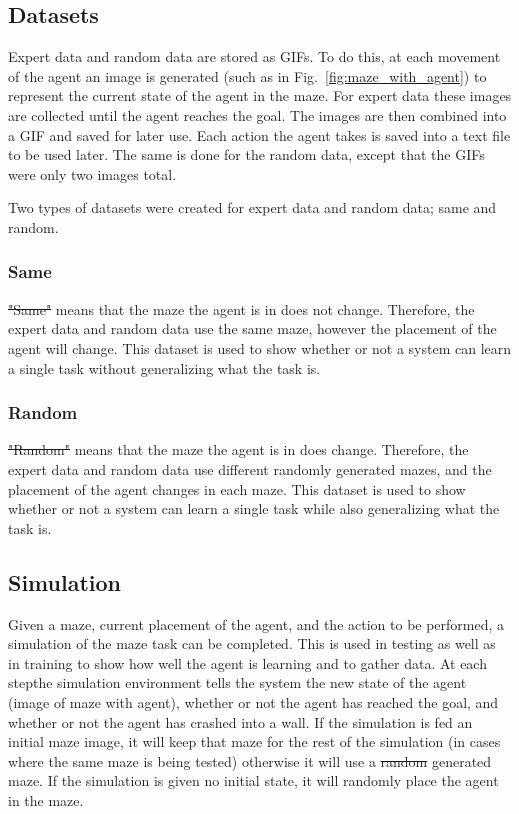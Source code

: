 \documentclass[12pt,american]{report}
\providecommand{\DIFaddtex}[1]{{\protect\color{blue}\uwave{#1}}} %
\providecommand{\DIFdeltex}[1]{{\protect\color{red}\sout{#1}}}                      %
\providecommand{\DIFaddbegin}{} %
\providecommand{\DIFaddend}{} %
\providecommand{\DIFdelbegin}{} %
\providecommand{\DIFdelend}{} %
\providecommand{\DIFadd}[1]{\texorpdfstring{\DIFaddtex{#1}}{#1}} %
\providecommand{\DIFdel}[1]{\texorpdfstring{\DIFdeltex{#1}}{}} %
\newcommand{\DIFscaledelfig}{0.5}
\newlength{\DIFdelgraphicswidth} %
\newlength{\DIFdelgraphicsheight} %
\newcommand{\DIFaddincludegraphics}[2][]{{\color{blue}\fbox{\DIFOincludegraphics[#1]{#2}}}} %
\newcommand{\DIFdelincludegraphics}[2][]{%
\sbox{\DIFdelgraphicsbox}{\DIFOincludegraphics[#1]{#2}}%
\settoboxwidth{\DIFdelgraphicswidth}{\DIFdelgraphicsbox} %
\settoboxtotalheight{\DIFdelgraphicsheight}{\DIFdelgraphicsbox} %
\scalebox{\DIFscaledelfig}{%
\parbox[b]{\DIFdelgraphicswidth}{\usebox{\DIFdelgraphicsbox}\\[-\baselineskip] \rule{\DIFdelgraphicswidth}{0em}}\llap{\resizebox{\DIFdelgraphicswidth}{\DIFdelgraphicsheight}{%
\setlength{\unitlength}{\DIFdelgraphicswidth}%
\begin{picture}(1,1)%
\thicklines\linethickness{2pt} %
{\color[rgb]{1,0,0}\put(0,0){\framebox(1,1){}}}%
{\color[rgb]{1,0,0}\put(0,0){\line( 1,1){1}}}%
{\color[rgb]{1,0,0}\put(0,1){\line(1,-1){1}}}%
\end{picture}%
}\hspace*{3pt}}} %
} %
\DeclareRobustCommand{\DIFaddbegin}{\DIFOaddbegin \let\includegraphics\DIFaddincludegraphics} %
\DeclareRobustCommand{\DIFaddend}{\DIFOaddend \let\includegraphics\DIFOincludegraphics} %
\DeclareRobustCommand{\DIFdelbegin}{\DIFOdelbegin \let\includegraphics\DIFdelincludegraphics} %
\DeclareRobustCommand{\DIFdelend}{\DIFOaddend \let\includegraphics\DIFOincludegraphics} %
\begin{document}
\subsection{Datasets}
Expert data and random data are stored as GIFs.  To do this, at each movement of the agent an image is generated (such as in Fig.~\ref{fig:maze_with_agent}) to represent the current state of the agent in the maze.  For expert data these images are collected until the agent reaches the goal. The images are then combined into a GIF and saved for later use.  Each action the agent takes is saved into a text file to be used later. The same is done for the random data, except that the GIFs were only two images total.

Two types of datasets were created for expert data and random data; same and random.
\subsubsection{Same}
\DIFdelbegin \DIFdel{"Same" }\DIFdelend \DIFaddbegin \DIFadd{``Same'' }\DIFaddend means that the maze the agent is in does not change.  Therefore, the expert data and random data use the same maze, however the placement of the agent will change.  This dataset is used to show whether or not a system can learn a single task without generalizing what the task is.

\subsubsection{Random}
\DIFdelbegin \DIFdel{"Random" }\DIFdelend \DIFaddbegin \DIFadd{``Random'' }\DIFaddend means that the maze the agent is in does change.  Therefore, the expert data and random data use different randomly generated mazes, and the placement of the agent changes in each maze.  This dataset is used to show whether or not a system can learn a single task while also generalizing what the task is.

\subsection{Simulation}
Given a maze, current placement of the agent, and the action to be performed, a simulation of the maze task can be completed.  This is used in testing as well as in training to show how well the agent is learning and to gather data.  At each step\DIFaddbegin \DIFadd{, }\DIFaddend the simulation environment tells the system the new state of the agent (image of maze with agent), whether or not the agent has reached the goal, and whether or not the agent has crashed into a wall.  If the simulation is fed an initial maze image, it will keep that maze for the rest of the simulation (in cases where the same maze is being tested) otherwise it will use a \DIFdelbegin \DIFdel{random }\DIFdelend \DIFaddbegin \DIFadd{randomly }\DIFaddend generated maze.  If the simulation is given no initial state, it will randomly place the agent in the maze.
\end{document}
